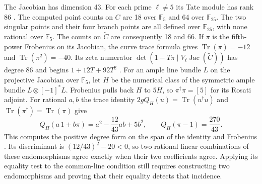 The Jacobian has dimension 43. For each prime \(\ell\ne5\) its Tate
module has rank 86 \cite{stacksPicardCurves}. The computed point counts
on \(C\) are 18 over \(\mathbb F_5\) and 64 over \(\mathbb F_{25}\).
The two singular points and their four branch points are all defined
over \(\mathbb F_{25}\), with none rational over \(\mathbb F_5\).
The counts on \(\widetilde C\) are consequently 18 and 66. If \(\pi\)
is the fifth-power Frobenius on its Jacobian, the curve trace formula
gives \(\operatorname{Tr}(\pi)=-12\) and
\(\operatorname{Tr}(\pi^2)=-40\). Its zeta numerator
\(\det(1-T\pi\mid V_\ell\operatorname{Jac}(\widetilde C))\) has degree
86 and begins \(1+12T+92T^2\) \cite{longCurveFrobenius}.
For an ample line bundle \(L\) on the projective Jacobian over
\(\mathbb F_5\), let \(H\) be the numerical class of the symmetric
ample bundle \(L\otimes[-1]^*L\). Frobenius pulls back \(H\) to \(5H\),
so \(\pi^\dagger\pi=[5]\) for its Rosati adjoint. For rational \(a,b\)
the trace identity \(2gQ_H(u)=\operatorname{Tr}(u^\dagger u)\) and
\(\operatorname{Tr}(\pi^\dagger)=\operatorname{Tr}(\pi)\) give
\[
 Q_H(a\,1+b\pi)=a^2-\frac{12}{43}ab+5b^2,\qquad
 Q_H(\pi-1)=\frac{270}{43}.
\]
This computes the positive degree form on the span of the identity
and Frobenius \cite{longAbelianComparison}. Its discriminant is
\((12/43)^2-20<0\), so two rational linear combinations of these
endomorphisms agree exactly when their two coefficients agree. Applying its equality
test to the common-line condition still requires constructing two
endomorphisms and proving that their equality detects that incidence.
